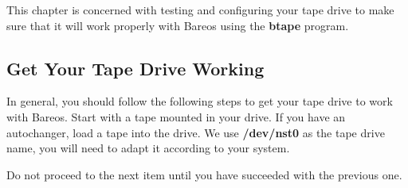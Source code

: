 

This chapter is concerned with testing and configuring your tape drive to make
sure that it will work properly with Bareos using the {\bf btape} program.

\subsection{Get Your Tape Drive Working}

In general, you should follow the following steps to get your tape drive to
work with Bareos. Start with a tape mounted in your drive. If you have an
autochanger, load a tape into the drive. We use {\bf /dev/nst0} as the tape
drive name, you will need to adapt it according to your system.

Do not proceed to the next item until you have succeeded with the previous
one.

